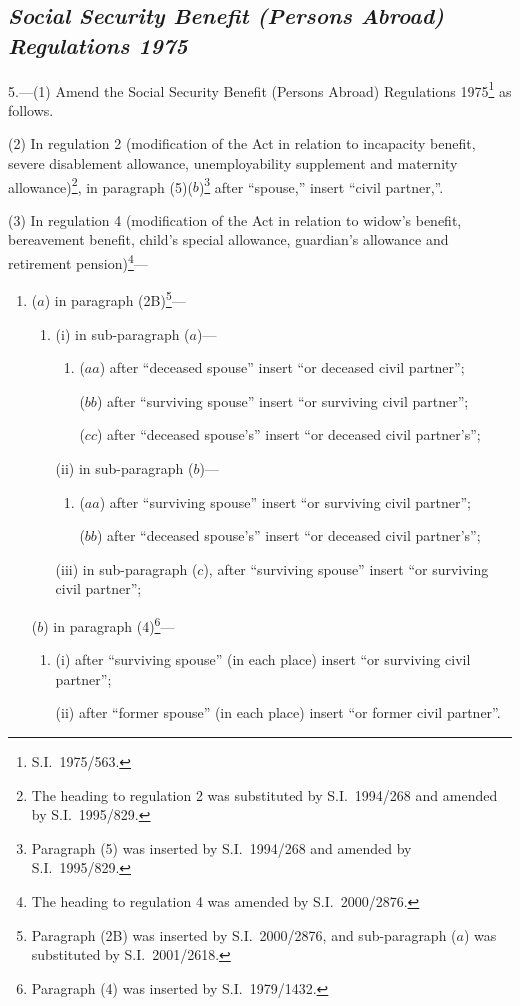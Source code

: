 \documentclass[12pt,a4paper]{article}
\begin{document}
\subsection*{\itshape Social Security Benefit (Persons Abroad) Regulations 1975}

5.---(1)  Amend the Social Security Benefit (Persons Abroad) Regulations 1975\footnote{S.I.\ 1975/563.} as follows.

(2) In regulation 2 (modification of the Act in relation to incapacity benefit, severe disablement allowance, unemployability supplement and maternity allowance)\footnote{The heading to regulation 2 was substituted by S.I.\ 1994/268 and amended by S.I.\ 1995/829.}, in paragraph (5)($b$)\footnote{Paragraph (5) was inserted by S.I.\ 1994/268 and amended by S.I.\ 1995/829.} after “spouse,” insert “civil partner,”.

(3) In regulation 4 (modification of the Act in relation to widow’s benefit, bereavement benefit, child’s special allowance, guardian’s allowance and retirement pension)\footnote{The heading to regulation 4 was amended by S.I.\ 2000/2876.}—
\begin{enumerate}\item[]
($a$) in paragraph (2B)\footnote{Paragraph (2B) was inserted by S.I.\ 2000/2876, and sub-paragraph ($a$) was substituted by S.I.\ 2001/2618.}—
\begin{enumerate}\item[]
(i) in sub-paragraph ($a$)—
\begin{enumerate}\item[]
($aa$) after “deceased spouse” insert “or deceased civil partner”;

($bb$) after “surviving spouse” insert “or surviving civil partner”;

($cc$) after “deceased spouse's” insert “or deceased civil partner's”;
\end{enumerate}

(ii) in sub-paragraph ($b$)—
\begin{enumerate}\item[]
($aa$) after “surviving spouse” insert “or surviving civil partner”;

($bb$) after “deceased spouse's” insert “or deceased civil partner's”;
\end{enumerate}

(iii) in sub-paragraph ($c$), after “surviving spouse” insert “or surviving civil partner”;
\end{enumerate}

($b$) in paragraph (4)\footnote{Paragraph (4) was inserted by S.I.\ 1979/1432.}—
\begin{enumerate}\item[]
(i) after “surviving spouse” (in each place) insert “or surviving civil partner”;

(ii) after “former spouse” (in each place) insert “or former civil partner”.
\end{enumerate}
\end{enumerate}
\end{document}
